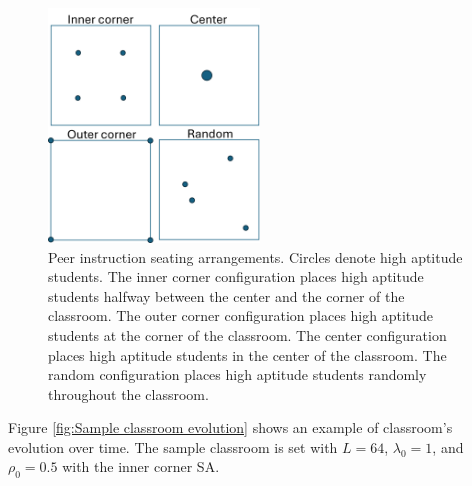  \begin{figure}[htbp!]
    \centering
    \includegraphics[width=0.5\textwidth]{figures/PI SAs.png}
    \caption[Peer instruction seating arrangements.]{ Peer instruction seating arrangements. 
    Circles denote high aptitude students. 
    The inner corner configuration places high aptitude students halfway between the center and the corner of the classroom. 
    The outer corner configuration places high aptitude students at the corner of the classroom. 
    The center configuration places high aptitude students in the center of the classroom. 
    The random configuration places high aptitude students randomly throughout the classroom.}
    \label{fig:PI SAs}
 \end{figure}

 Figure \ref{fig:Sample classroom evolution} shows an example of classroom's evolution over time. The sample classroom is set with $L=64$, $\lambda_0 = 1$, and $\rho_0 = 0.5$ with the inner corner SA.

